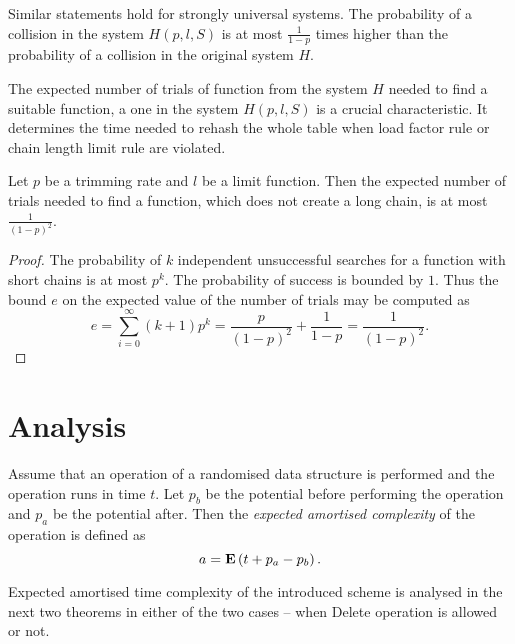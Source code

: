 Similar statements hold for strongly universal systems. The probability of a collision in the system $H(p, l, S)$ is at most $\frac{1}{1 - p}$ times higher than the probability of a collision in the original system $H$.

The expected number of trials of function from the system $H$ needed to find a suitable function, a one in the system $H(p, l, S)$ is a crucial characteristic. It determines the time needed to rehash the whole table when load factor rule or chain length limit rule are violated. 

\begin{lemma}
\label{lemma-linear-transformations-trials}
Let $p$ be a trimming rate and $l$ be a limit function. Then the expected number of trials needed to find a function, which does not create a long chain, is at most $\frac{1}{(1 - p) ^ 2}$.
\end{lemma}
\begin{proof}
The probability of $k$ independent unsuccessful searches for a function with short chains is at most $p ^ k$. The probability of success is bounded by $1$. Thus the bound $e$ on the expected value of the number of trials may be computed as
\[
e = \sum_{i = 0}^{\infty} (k + 1)p^k = \frac{p}{(1 - p) ^ 2} + \frac{1}{1 - p} = \frac{1}{(1 - p) ^ 2} \text{.}
\]
\end{proof}

\section{Analysis}

\begin{definition}
Assume that an operation of a randomised data structure is performed and the operation runs in time $t$. Let $p_b$ be the potential before performing the operation and $p_a$ be the potential after. Then the \emph{expected amortised complexity} of the operation is defined as \[ a = \mathbf{E}\left(t + p_a - p_{b}\right) \text{.} \]
\end{definition}

Expected amortised time complexity of the introduced scheme is analysed in the next two theorems in either of the two cases -- when Delete operation is allowed or not.

